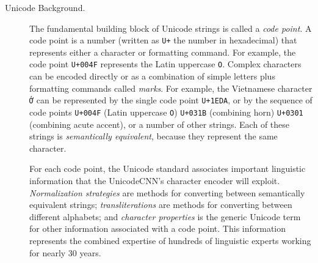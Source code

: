 \documentclass[sigconf,anonymous,review]{acmart}
\newcommand{\str}[1]{\texttt{#1}}
\newcommand{\defn}[1]{\textit{#1}}
\begin{document}
\begin{description}


\item[Unicode Background.]
The fundamental building block of Unicode strings is called a \defn{code point}.
A code point is a number (written as \str{U+} the number in hexadecimal)
that represents either a character or formatting command.
For example, the code point \str{U+004F} represents the Latin uppercase \str{O}.
Complex characters can be encoded directly or as a combination of simple letters plus formatting commands called \defn{marks}.
For example, the Vietnamese character \str{\foreignlanguage{vietnamese}{Ớ}} can be represented by the single code point \str{U+1EDA},
or by the sequence of code points \str{U+004F} (Latin uppercase \str{O}) \str{U+031B} (combining horn) \str{U+0301} (combining acute accent),
or a number of other strings.
Each of these strings is \defn{semantically equivalent},
because they represent the same character.

For each code point, the Unicode standard \citep{Unicode} associates important linguistic information that the UnicodeCNN's character encoder will exploit.
\defn{Normalization strategies} are methods for converting between semantically equivalent strings;
\defn{transliterations} are methods for converting between different alphabets;
and \defn{character properties} is the generic Unicode term for other information associated with a code point. 
This information represents the combined expertise of hundreds of linguistic experts working for nearly 30 years.



\end{description}
\end{document}
